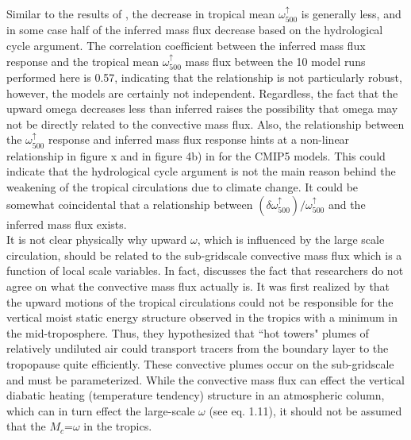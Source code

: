\documentclass[letterpaper,12pt,titlepage,oneside,final]{book}
\begin{document}
Similar to the results of \cite{vecchi_global_2007}, the decrease in tropical mean $\omega_{500}^{\uparrow}$ is generally less, and in some case half of the inferred mass flux decrease based on the hydrological cycle argument. The correlation coefficient between the inferred mass flux response and the tropical mean $\omega_{500}^{\uparrow}$ mass flux between the 10 model runs performed here is 0.57, indicating that the relationship is not particularly robust, however, the models are certainly not independent. Regardless, the fact that the upward omega decreases less than inferred raises the possibility that omega may not be directly related to the convective mass flux. Also, the relationship between the $\omega_{500}^{\uparrow}$ response and inferred mass flux response hints at a non-linear relationship in figure x and in figure 4b) in \cite{vecchi_global_2007} for the CMIP5 models. This could indicate that the hydrological cycle argument is not the main reason behind the weakening of the tropical circulations due to climate change. It could be somewhat coincidental that a relationship between $(\delta{\omega_{500}^{\uparrow}})/\omega_{500}^{\uparrow}$ and the inferred mass flux exists.
\\
It is not clear physically why upward $\omega$, which is influenced by the large scale circulation, should be related to the sub-gridscale convective mass flux which is a function of local scale variables. In fact, \cite{yano_deep-convective_2009} discusses the fact that researchers do not agree on what the convective mass flux actually is. It was first realized by \cite{riehl_and_malkus_heat_1958} that the upward motions of the tropical circulations could not be responsible for the vertical moist static energy structure observed in the tropics with a minimum in the mid-troposphere. Thus, they hypothesized that ``hot towers" plumes of relatively undiluted air could transport tracers from the boundary layer to the tropopause quite efficiently. These convective plumes occur on the sub-gridscale and must be parameterized. While the convective mass flux can effect the vertical diabatic heating (temperature tendency) structure in an atmospheric column, which can in turn effect the large-scale $\omega$ (see eq. 1.11), it should not be assumed that the $M_{c}$=$\omega$ in the tropics.
\end{document}
